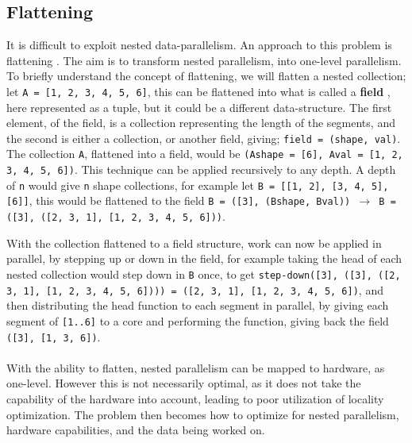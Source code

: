 \subsection{Flattening}
It is difficult to exploit nested data-parallelism. An approach to this problem is flattening \cite{flat}. The aim is to transform nested parallelism, into one-level parallelism. To briefly understand the concept of flattening, we will flatten a nested collection; let \texttt{A = [1, 2, 3, 4, 5, 6]}, this can be flattened into what is called a \textbf{field} \cite{flat}, here represented as a tuple, but it could be a different data-structure. The first element, of the field, is a collection representing the length of the segments, and the second is either a collection, or another field, giving; \texttt{field = (shape, val)}. The collection \texttt{A}, flattened into a field, would be \texttt{(Ashape = [6], Aval = [1, 2, 3, 4, 5, 6])}. This technique can be applied recursively to any depth. A depth of \texttt{n} would give \texttt{n} shape collections, for example let \texttt{B = [[1, 2], [3, 4, 5], [6]]}, this would be flattened to the field \texttt{B = ([3], (Bshape, Bval)) $\to$ B = ([3], ([2, 3, 1], [1, 2, 3, 4, 5, 6]))}. 

With the collection flattened to a field structure, work can now be applied in parallel, by stepping up or down in the field, for example taking the head of each nested collection would step down in \texttt{B} once, to get \texttt{step-down([3], ([3], ([2, 3, 1], [1, 2, 3, 4, 5, 6]))) = ([2, 3, 1], [1, 2, 3, 4, 5, 6])}, and then distributing the head function to each segment in parallel, by giving each segment of \texttt{[1..6]} to a core and performing the function, giving back the field \texttt{([3], [1, 3, 6])}.\\\\
With the ability to flatten, nested parallelism can be mapped to hardware, as one-level. However this is not necessarily optimal, as it does not take the capability of the hardware into account, leading to poor utilization of locality optimization. The problem then becomes how to optimize for nested parallelism, hardware capabilities, and the data being worked on.


